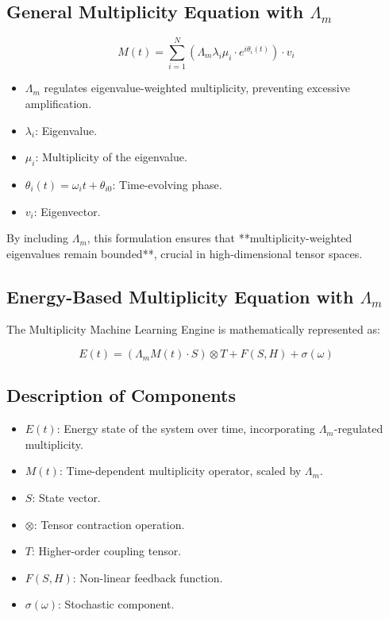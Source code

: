 \documentclass{article}
\theoremstyle{plain}
\begin{document}
\subsection{General Multiplicity Equation with \( \Lambda_m \)}

\begin{equation}
M(t) = \sum_{i=1}^N \left( \Lambda_m \lambda_i \mu_i \cdot e^{i\theta_i(t)} \right) \cdot v_i
\end{equation}

\begin{itemize}
    \item \( \Lambda_m \) regulates eigenvalue-weighted multiplicity, preventing excessive amplification.
    \item \( \lambda_i \): Eigenvalue.
    \item \( \mu_i \): Multiplicity of the eigenvalue.
    \item \( \theta_i(t) = \omega_i t + \theta_{i0} \): Time-evolving phase.
    \item \( v_i \): Eigenvector.
\end{itemize}

By including \( \Lambda_m \), this formulation ensures that **multiplicity-weighted eigenvalues remain bounded**, crucial in high-dimensional tensor spaces.

\subsection{Energy-Based Multiplicity Equation with \( \Lambda_m \)}

The Multiplicity Machine Learning Engine is mathematically represented as:

\begin{equation}
E(t) = (\Lambda_m M(t) \cdot S) \otimes T + F(S, H) + \sigma(\omega)
\end{equation}

\subsection{Description of Components}

\begin{itemize}
    \item \textbf{\( E(t) \)}: Energy state of the system over time, incorporating \( \Lambda_m \)-regulated multiplicity.
    \item \textbf{\( M(t) \)}: Time-dependent multiplicity operator, scaled by \( \Lambda_m \).
    \item \textbf{\( S \)}: State vector.
    \item \textbf{\( \otimes \)}: Tensor contraction operation.
    \item \textbf{\( T \)}: Higher-order coupling tensor.
    \item \textbf{\( F(S, H) \)}: Non-linear feedback function.
    \item \textbf{\( \sigma(\omega) \)}: Stochastic component.
\end{itemize}
\end{document}
